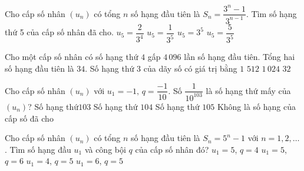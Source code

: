 \begin{ex}%
	Cho cấp số nhân $(u_n)$ có tổng $n$ số hạng đầu  tiên là $S_n=\dfrac{3^n-1}{3^{n-1}}$. Tìm số hạng thứ 5 của cấp số nhân đã cho.
	 \choice
		{\True  $u_5=\dfrac{2}{3^4}$}
		{$u_5=\dfrac{1}{3^5}$} 
		 {$u_5=3^5$}
		 {$u_5=\dfrac{5}{3^5}$}
\end{ex}

\begin{ex}%
	Cho một cấp số nhân có số hạng thứ $4$ gấp $4\,096$ lần số hạng đầu tiên. Tổng hai số hạng đầu tiên là $34$. Số hạng thứ $3$ của dãy số  có giá trị bằng
	\choice 
		 {$1$}
		 {\True $512$}
		{$1\,024$} 
		{$32$} 
\end{ex}

\begin{ex}%
	Cho cấp  số nhân $(u_n)$ với $u_1=-1,\,q=\dfrac{-1}{10}$. Số $\dfrac{1}{10^{103}}$ là số hạng thứ mấy của $(u_n)$?
	\choice 
		{Số hạng  thứ$103$}
		 {\True Số hạng thứ $104$}
		{Số hạng thứ $105$} 
		{Không là số hạng của cấp số đã  cho}
\end{ex}

\begin{ex}%
	Cho cấp số nhân $(u_n)$ có tổng $n$ số hạng đầu tiên là $S_n=5^n-1$ với $n=1,2,\ldots$. Tìm số hạng đầu $u_1$ và công bội $q$ của cấp số nhân đó? 
	 \choice
		{$u_1=5$,  $q=4$}
		{$u_1=5$, $q=6$} 
		{\True  $u_1=4$, $q=5$}
		{$u_1=6$,  $q=5$}
\end{ex}


